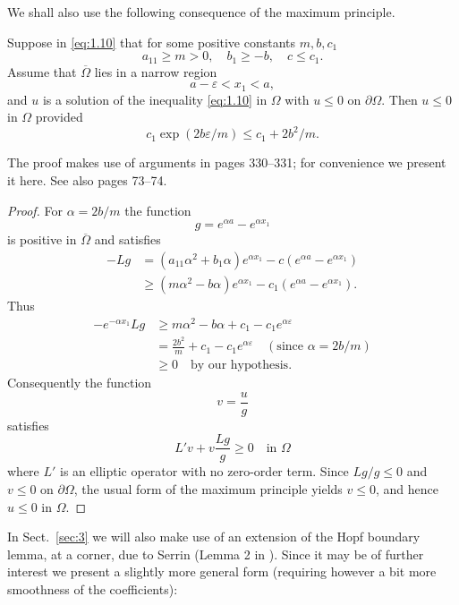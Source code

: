 We shall also use the following consequence of the maximum principle.

\begin{corollary*}
  Suppose in \eqref{eq:1.10} that for some positive constants $m,b,c_1$
  \[a_{11}\geq m>0,\quad b_1\geq -b,\quad c\leq c_1.\]
  Assume that $\overline{\Omega}$ lies in a narrow region
  \[a-\varepsilon < x_1 < a,\]
  and $u$ is a solution of the inequality \eqref{eq:1.10} in $\Omega$
  with $u\leq 0$ on $\partial\Omega$. Then $u\leq 0$ in $\Omega$ provided
  \[c_1\exp(2b\varepsilon/m) \leq c_1 + 2b^2/m.\]
\end{corollary*}

The proof makes use of arguments in \cite{courant_methods_1989} pages 330--331;
for convenience we present it here. See also \cite{protter_maximum_1984} pages 73--74.

\begin{proof}
  For $\alpha = 2b/m$ the function
  \[g = e^{\alpha a} - e^{\alpha x_1}\]
  is positive in $\overline{\Omega}$ and satisfies
  \begin{align*}
    -Lg
    & = (a_{11}\alpha^2 + b_1\alpha)e^{\alpha x_1} -c(e^{\alpha a}-e^{\alpha x_1}) \\
    & \geq (m\alpha^2-b\alpha)e^{\alpha x_1} - c_1(e^{\alpha a}-e^{\alpha x_1}).
  \end{align*}
  Thus
  \begin{align*}
    -e^{-\alpha x_1} Lg
    & \geq m\alpha^2 - b\alpha + c_1 - c_1 e^{\alpha\varepsilon} \\
    & = \frac{2b^2}{m} + c_1 - c_1 e^{\alpha\varepsilon}\quad (\text{since } \alpha=2b/m) \\
    & \geq 0\quad \text{by our hypothesis}.
  \end{align*}
  Consequently the function
  \[v = \frac{u}{g}\]
  satisfies
  \[L'v + v\frac{Lg}{g} \geq 0\quad\text{in } \Omega\]
  where $L'$ is an elliptic operator with no zero-order term.
  Since $Lg/g\leq 0$ and $v\leq 0$ on $\partial\Omega$,
  the usual form of the maximum principle yields $v\leq 0$,
  and hence $u\leq 0$ in $\Omega$.
\end{proof}

  
In Sect.~\ref{sec:3} we will also make use of an extension of the Hopf boundary lemma,
at a corner, due to Serrin (Lemma 2 in \cite{serrin_symmetry_1971}). Since it may be of further interest
we present a slightly more general form (requiring however a bit more smoothness of
the coefficients):


